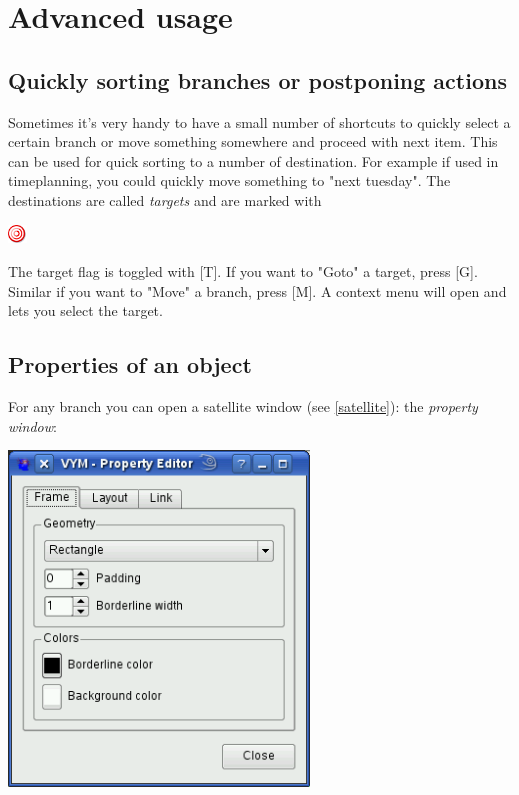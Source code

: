 \documentclass[12pt,a4paper]{article}
\newcommand{\key}[1]{[#1]}
\begin{document}
\section{Advanced usage}

\subsection{Quickly sorting branches or postponing actions} \label{targets}
Sometimes it's very handy to have a small number of shortcuts to quickly
select a certain branch or move something somewhere and proceed with
next item. This can be used for quick sorting to a number of
destination. For example if used in timeplanning, you could quickly move something
to "next tuesday". The destinations are called {\em targets} and are
marked with 
\begin{center}
    \includegraphics[width=0.5cm]{images/flag-target.png}
    \label{propwindow}
\end{center}
The target flag is toggled with \key{T}. If you want to "Goto" a target,
press \key{G}. Similar if you want to "Move" a branch, press \key{M}.
A context menu will open and lets you select the target.



\subsection{Properties of an object} 
For any branch you can open a satellite window (see \ref{satellite}):
the {\em property window}:
\begin{center}
    \includegraphics[width=8cm]{images/propwindow.png}
    \label{propwindow}
\end{center}
\end{document}
